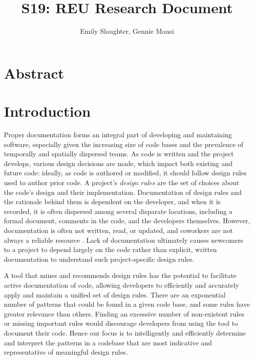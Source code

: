 \documentclass[12pt]{article}
\title{S19: REU Research Document}
\author{Emily Slaughter, Gennie Mansi}
\begin{document}
\maketitle

\clearpage

\tableofcontents

\clearpage

\section{Abstract} \label{abstract}



\clearpage
\section{Introduction} \label{intro}

Proper documentation forms an integral part of developing and maintaining software, especially given the increasing size of code bases and the prevalence of temporally and spatially dispersed teams. As code is written and the project develops, various design decisions are made, which impact both existing and future code: ideally, as code is authored or modified, it should follow design rules used to author prior code. A project's \textit{design rules} are the set of choices about the code's design and their implementation. Documentation of design rules and the rationale behind them is dependent on the developer, and when it is recorded, it is often dispersed among several disparate locations, including a formal document, comments in the code, and the developers themselves. However, documentation is often not written, read, or updated, and coworkers are not always a reliable resource \cite{KoEtAl2007}. Lack of documentation ultimately causes newcomers to a project to depend largely on the code rather than explicit, written documentation to understand such project-specific design rules.

A tool that mines and recommends design rules has the potential to facilitate active documentation of code, allowing developers to efficiently and accurately apply and maintain a unified set of design rules. There are an exponential number of patterns that could be found in a given code base, and some rules have greater relevance than others. Finding an excessive number of non-existent rules or missing important rules would discourage developers from using the tool to document their code. Hence our focus is to intelligently and efficiently determine and interpret the patterns in a codebase that are most indicative and representative of meaningful design rules.
\end{document}
